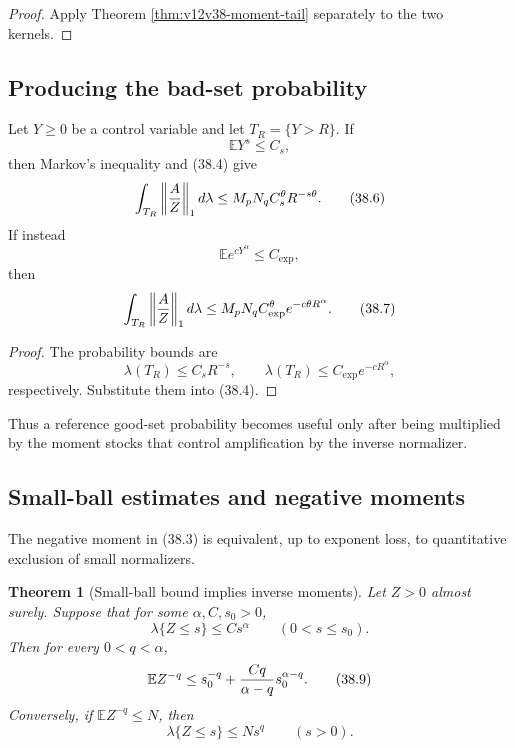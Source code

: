\documentclass[11pt]{article}
\newtheorem{theorem}{Theorem}[section]
\theoremstyle{remark}
\begin{document}
\begin{proof}
Apply Theorem \ref{thm:v12v38-moment-tail} separately to the two
kernels.
\end{proof}

\subsection{Producing the bad-set probability}

Let \(Y\geq0\) be a control variable and let
\(T_R=\{Y>R\}\).  If
\[
 \mathbb E Y^s\leq C_s,
\]
then Markov's inequality and (38.4) give
\begin{equation}
 \int_{T_R}\left\|{A\over Z}\right\|_1d\lambda
 \leq
 M_pN_q C_s^\theta R^{-s\theta}.                 \tag{38.6}
\end{equation}
If instead
\[
 \mathbb E e^{cY^\alpha}\leq C_{\exp},
\]
then
\begin{equation}
 \int_{T_R}\left\|{A\over Z}\right\|_1d\lambda
 \leq
 M_pN_q C_{\exp}^{\theta}
 e^{-c\theta R^\alpha}.                          \tag{38.7}
\end{equation}

\begin{proof}
The probability bounds are
\[
 \lambda(T_R)\leq C_sR^{-s},
 \qquad
 \lambda(T_R)\leq C_{\exp}e^{-cR^\alpha},
\]
respectively.  Substitute them into (38.4).
\end{proof}

Thus a reference good-set probability becomes useful only after
being multiplied by the moment stocks that control amplification by
the inverse normalizer.

\subsection{Small-ball estimates and negative moments}

The negative moment in (38.3) is equivalent, up to exponent loss, to
quantitative exclusion of small normalizers.

\begin{theorem}[Small-ball bound implies inverse moments]
\label{thm:v12v38-small-ball}
Let \(Z>0\) almost surely.  Suppose that for some
\(\alpha,C,s_0>0\),
\begin{equation}
 \lambda\{Z\leq s\}\leq Cs^\alpha
 \qquad(0<s\leq s_0).                            \tag{38.8}
\end{equation}
Then for every \(0<q<\alpha\),
\begin{equation}
 \mathbb E Z^{-q}
 \leq
 s_0^{-q}
 +
 {Cq\over\alpha-q}s_0^{\alpha-q}.               \tag{38.9}
\end{equation}
Conversely, if \(\mathbb E Z^{-q}\leq N\), then
\begin{equation}
 \lambda\{Z\leq s\}\leq Ns^q
 \qquad(s>0).                                    \tag{38.10}
\end{equation}
\end{theorem}
\end{document}
